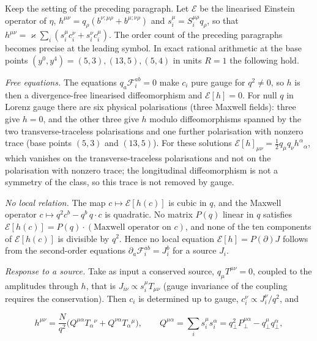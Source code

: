 Keep the setting of the preceding paragraph. Let \(\mathcal E\) be the linearised Einstein operator of \(\eta\), \(h^{\mu\nu}=q_\rho(b^{\nu;\mu\rho}+b^{\mu;\nu\rho})\) and \(s_i^\mu=S_i^{\mu\rho}q_\rho\), so that \(h^{\mu\nu}=\varkappa\sum_i(s_i^\mu c_i^\nu+s_i^\nu c_i^\mu)\). The order count of the preceding paragraphs becomes precise at the leading symbol. In exact rational arithmetic at the base points \((y^0,y^4)=(5,3),(13,5),(5,4)\) in units \(R=1\) the following hold.



\emph{Free equations.} The equations \(q_a\mathcal F_i^{ab}=0\) make \(c_i\) pure gauge for \(q^2\neq0\), so \(h\) is then a divergence-free linearised diffeomorphism and \(\mathcal E[h]=0\). For null \(q\) in Lorenz gauge there are six physical polarisations (three Maxwell fields): three give \(h=0\), and the other three give \(h\) modulo diffeomorphisms spanned by the two transverse-traceless polarisations and one further polarisation with nonzero trace (base points \((5,3)\) and \((13,5)\)). For these solutions \(\mathcal E[h]_{\mu\nu}=\tfrac12q_\mu q_\nu h^\alpha{}_\alpha\), which vanishes on the transverse-traceless polarisations and not on the polarisation with nonzero trace; the longitudinal diffeomorphism is not a symmetry of the class, so this trace is not removed by gauge.



\emph{No local relation.} The map \(c\mapsto\mathcal E[h(c)]\) is cubic in \(q\), and the Maxwell operator \(c\mapsto q^2c^b-q^b\,q\cdot c\) is quadratic. No matrix \(P(q)\) linear in \(q\) satisfies \(\mathcal E[h(c)]=P(q)\cdot(\text{Maxwell operator on }c)\), and none of the ten components of \(\mathcal E[h(c)]\) is divisible by \(q^2\). Hence no local equation \(\mathcal E[h]=P(\partial)J\) follows from the second-order equations \(\partial_a\mathcal F_i^{ab}=J_i^b\) for a source \(J_i\).



\emph{Response to a source.} Take as input a conserved source, \(q_\mu T^{\mu\nu}=0\), coupled to the amplitudes through \(h\), that is \(J_{i\nu}\propto s_i^\mu T_{\mu\nu}\) (gauge invariance of the coupling requires the conservation). Then \(c_i\) is determined up to gauge, \(c_i^\nu\propto J_i^\nu/q^2\), and

\[

h^{\mu\nu}=\frac{N}{q^2}\bigl(Q^{\mu\alpha}T_\alpha{}^\nu+Q^{\nu\alpha}T_\alpha{}^\mu\bigr),\qquad

Q^{\mu\alpha}=\sum_is_i^\mu s_i^\alpha=q_\perp^2P_\perp^{\mu\alpha}-q_\perp^\mu q_\perp^\alpha ,

\]

